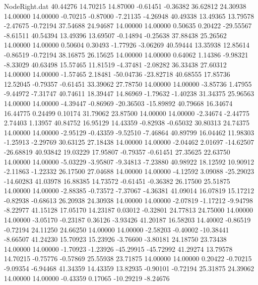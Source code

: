 \begin{filecontents}{NodeRight.dat}
  40.44276   14.70215   14.87000    -0.61451   -0.36382   36.62812   24.30938   14.00000   14.00000   -0.70215   -0.87000   -7.21135   -4.26948
  40.49338   13.49365   13.79578    -2.47675   -0.72194   37.54688   24.94687   14.00000   14.00000    0.50635    0.20422  -29.55567   -8.61511
  40.54394   13.49396   13.69507    -0.14894   -0.25638   37.88438   25.26562   14.00000   14.00000    0.50604    0.30493   -1.77926   -3.06269
  40.59444   13.35938   12.85614    -0.86519   -0.72194   38.16875   26.15625   14.00000   14.00000    0.64062    1.14386   -9.98321   -8.33029
  40.63498   15.57465   11.81519    -4.37481   -2.08282   36.33438   27.60312   14.00000   14.00000   -1.57465    2.18481  -50.04736  -23.82718
  40.68555   17.85736   12.52045    -0.79357   -0.61451   33.39062   27.78750   14.00000   14.00000   -3.85736    1.47955   -9.44972   -7.31747
  40.74611   18.39447   14.86969    -1.79632   -1.40238   31.34375   25.96563   14.00000   14.00000   -4.39447   -0.86969  -20.36503  -15.89892
  40.79668   16.34674   16.44775     0.24499    0.10174   31.79062   23.87500   14.00000   14.00000   -2.34674   -2.44775    2.74403    1.13957
  40.84752   16.95129   14.43359    -0.82938   -0.65032   30.80313   24.74375   14.00000   14.00000   -2.95129   -0.43359   -9.52510   -7.46864
  40.89799   16.04462   11.98303    -1.25913   -2.29769   30.63125   27.18438   14.00000   14.00000   -2.04462    2.01697  -14.62507  -26.68819
  40.93842   19.03229   17.95807    -0.79357   -0.61451   27.35625   22.63750   14.00000   14.00000   -5.03229   -3.95807   -9.34813   -7.23880
  40.98922   18.12592   10.90912    -2.11863   -1.22332   26.17500   27.04688   14.00000   14.00000   -4.12592    3.09088  -25.29023  -14.60283
  41.03978   16.88385   14.73572    -0.61451   -0.36382   26.17500   25.51875   14.00000   14.00000   -2.88385   -0.73572   -7.37067   -4.36381
  41.09014   16.07819   15.17212    -0.82938   -0.68613   26.20938   24.30938   14.00000   14.00000   -2.07819   -1.17212   -9.94798   -8.22977
  41.15128   17.05170   14.23187     0.03012   -0.32801   24.77813   24.75000   14.00000   14.00000   -3.05170   -0.23187    0.36126   -3.93426
  41.20187   16.58203   14.40002    -0.86519   -0.72194   24.11250   24.66250   14.00000   14.00000   -2.58203   -0.40002  -10.38441   -8.66507
  41.24230   15.70923   15.23926    -3.76600   -3.80181   24.18750   23.73438   14.00000   14.00000   -1.70923   -1.23926  -45.29915  -45.72992
  41.29274   13.79578   14.70215    -0.75776   -0.57869   25.55938   23.71875   14.00000   14.00000    0.20422   -0.70215   -9.09354   -6.94468
  41.34359   14.43359   13.82935    -0.90101   -0.72194   25.31875   24.39062   14.00000   14.00000   -0.43359    0.17065  -10.29219   -8.24676

\end{filecontents}
